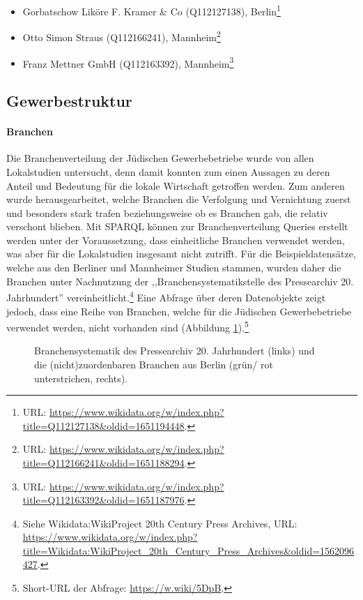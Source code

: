 \begin{itemize}
    \item Gorbatschow Liköre F. Kramer \& Co (Q112127138), Berlin\footnote{URL: \url{https://www.wikidata.org/w/index.php?title=Q112127138\&oldid=1651194448}.}
    \item Otto Simon Straus (Q112166241), Mannheim\footnote{URL: \url{https://www.wikidata.org/w/index.php?title=Q112166241\&oldid=1651188294}.}
    \item Franz Mettner GmbH (Q112163392), Mannheim\footnote{URL: \url{https://www.wikidata.org/w/index.php?title=Q112163392\&oldid=1651187976}.}
\end{itemize}

\subsection{Gewerbestruktur}

\paragraph{Branchen} Die Branchenverteilung der Jüdischen Gewerbebetriebe wurde von allen Lokalstudien untersucht, denn damit konnten zum einen Aussagen zu deren Anteil und Bedeutung für die lokale Wirtschaft getroffen werden. Zum anderen wurde herausgearbeitet, welche Branchen die Verfolgung und Vernichtung zuerst und besonders stark trafen beziehungsweise ob es Branchen gab, die relativ verschont blieben. Mit SPARQL können zur Branchenverteilung Queries erstellt werden unter der Voraussetzung, dass einheitliche Branchen verwendet werden, was aber für die Lokalstudien insgesamt nicht zutrifft. Für die Beispieldatensätze, welche aus den Berliner und Mannheimer Studien stammen, wurden daher die Branchen unter Nachnutzung der ,,Branchensystematikstelle des Pressearchiv 20. Jahrhundert'' vereinheitlicht.\footnote{Siehe Wikidata:WikiProject 20th Century Press Archives, URL: \url{https://www.wikidata.org/w/index.php?title=Wikidata:WikiProject\_20th\_Century\_Press\_Archives\&oldid=1562096427}.} Eine Abfrage über deren Datenobjekte zeigt jedoch, dass eine Reihe von Branchen, welche für die Jüdischen Gewerbebetriebe verwendet werden, nicht vorhanden sind (Abbildung \ref{fig:wikidatasectors}).\footnote{Short-URL der Abfrage: \url{https://w.wiki/5DpB}.} 

\begin{figure}[h]
    \centering
    \caption{Branchensystematik des Pressearchiv 20. Jahrhundert (links) und die (nicht)zuordenbaren Branchen aus Berlin (grün/ rot unterstrichen, rechts).}
    \label{fig:wikidatasectors}
\end{figure}

